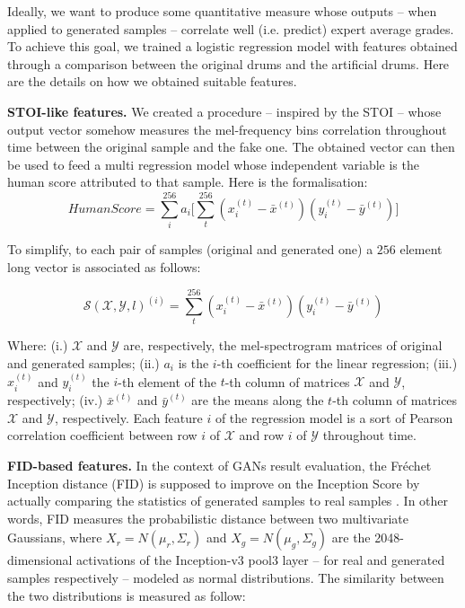 \documentclass[journal]{IEEEtran}
\begin{document}
Ideally, we want to produce some quantitative measure whose outputs -- when applied to generated samples -- %
correlate well (i.e. predict) expert average grades. To achieve this goal, we trained a logistic regression model with features obtained through a comparison between the original drums and the artificial drums. Here are the details on how we obtained suitable features.

\textbf{STOI-like features.} We created a procedure -- inspired by the STOI \cite{andersen2017non} -- whose output vector somehow measures the mel-frequency bins correlation throughout time between the original sample and the fake one. The obtained vector can then be used to feed a multi regression model whose independent variable is the human score attributed to that sample.  Here is the formalisation: $$
HumanScore = \sum_i^{256} a_i \biggl[ \sum_t^{256}(x_i^{(t)}-\bar x^{(t)})(y_i^{(t)}-\bar y^{(t)}) \biggr]
$$

To simplify, to each pair of samples (original and generated one) a $256$ element long vector is associated as follows: 

$$\mathcal{S}(\mathcal{X},\mathcal{Y}, l)^{(i)} = \sum_t^{256}(x_i^{(t)}-\bar x^{(t)})(y_i^{(t)}-\bar y^{(t)})
$$

Where: (i.) $\mathcal{X}$ and $\mathcal{Y}$ are, respectively, the mel-spectrogram matrices of original and generated samples; (ii.) $a_i$ is the $i$-th coefficient for the linear regression; (iii.) $x_i^{(t)}$ and $y_i^{(t)}$ the $i$-th element of the $t$-th column of matrices $\mathcal{X}$ and $\mathcal{Y}$, respectively; (iv.) $\bar x^{(t)}$ and $\bar y^{(t)}$ are the means along the $t$-th column of matrices $\mathcal{X}$ and $\mathcal{Y}$, respectively. Each feature $i$ of the regression model is a sort of Pearson correlation coefficient between row $i$ of $\mathcal{X}$ and row $i$ of $\mathcal{Y}$ throughout time.

\textbf{FID-based features.} In the context of GANs result evaluation, the Fréchet Inception distance (FID) is supposed to improve on the Inception Score by actually comparing the statistics of generated samples to real samples 
\cite{heusel2017gans}. In other words, FID measures the probabilistic distance between two multivariate Gaussians, where $X_r = N(\mu_r,\Sigma_r)$ and $X_g = N(\mu_g,\Sigma_g)$ are the 2048-dimensional activations of the Inception-v3 pool3 layer -- for real and generated samples respectively -- modeled as normal distributions. The similarity between the two distributions is measured as follow:
\end{document}
